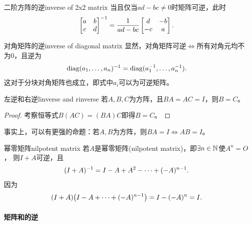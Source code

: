 \begin{example}{二阶方阵的逆}{inverse of 2x2 matrix}
	当且仅当$ad - bc \neq 0$时矩阵可逆，此时
	\begin{equation}
		\begin{bmatrix}
			a&b\\c&d
		\end{bmatrix}^{-1} = \frac1{ad - bc}
		\begin{bmatrix}
			d&-b\\
			-c&a
		\end{bmatrix}.
	\end{equation}
\end{example}
\begin{example}{对角矩阵的逆}{inverse of diagonal matrix}
	显然，对角矩阵可逆$\iff$所有对角元均不为0，且逆为
	\begin{align}
		\operatorname{diag}(a_1,\ldots,a_n)^{-1} = \operatorname{diag}(a_1^{-1},\ldots,a_n^{-1}).
	\end{align}
	这对于分块对角矩阵也成立，即式中$a_i$可以为可逆矩阵。
\end{example}
\begin{theorem}{左逆和右逆}{linverse and rinverse}
	若$A,B,C$为方阵，且$BA = AC = I$，则$B = C$。
\end{theorem}
\begin{proof}
	考察恒等式$B(AC) = (BA)C$即得$B = C$。
\end{proof}
\begin{remark}
	事实上，可以有更强的命题：若$A,B$为方阵，则$BA = I \iff AB = I$。
\end{remark}
\begin{example}{幂零矩阵}{nilpotent matrix}
	若$A$是幂零矩阵(nilpotent matrix)，即$\exists n \in \mathbb{N}$使$A^n = O$，
	则$I + A$可逆，且
	\begin{equation}\label{eq:la-nilpotent-geometric-series}
		(I + A)^{-1} = I - A + A^2 - \cdots + (-A)^{n-1}.
	\end{equation}
	因为
	\[
		(I + A)\bigl(I - A + \cdots + (-A)^{n-1}\bigr) = I - (-A)^n = I.
	\]
\end{example}

\paragraph{矩阵和的逆}

